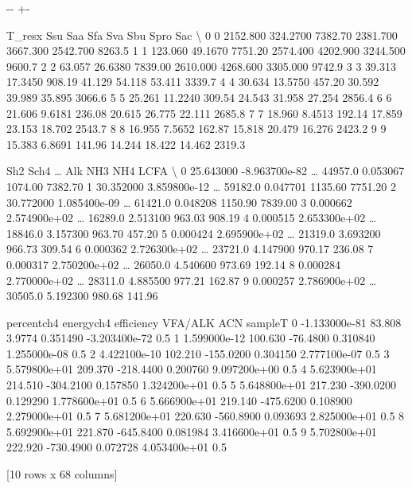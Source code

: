 \documentclass[a4paper,10pt,english]{sphinxmanual}
\newlength\nbsphinxcodecellspacing
\begin{document}
{

\kern-\sphinxverbatimsmallskipamount\kern-\baselineskip
\kern+\FrameHeightAdjust\kern-\fboxrule
\vspace{\nbsphinxcodecellspacing}

\begin{sphinxVerbatim}[commandchars=\\\{\}]
\llap{\color{nbsphinxout}[7]:\,\hspace{\fboxrule}\hspace{\fboxsep}}   T\_resx      Ssu       Saa      Sfa       Sva       Sbu      Spro     Sac   \textbackslash{}
0       0  2152.800  324.2700  7382.70  2381.700  3667.300  2542.700  8263.5
1       1   123.060   49.1670  7751.20  2574.400  4202.900  3244.500  9600.7
2       2    63.057   26.6380  7839.00  2610.000  4268.600  3305.000  9742.9
3       3    39.313   17.3450   908.19    41.129    54.118    53.411  3339.7
4       4    30.634   13.5750   457.20    30.592    39.989    35.895  3066.6
5       5    25.261   11.2240   309.54    24.543    31.958    27.254  2856.4
6       6    21.606    9.6181   236.08    20.615    26.775    22.111  2685.8
7       7    18.960    8.4513   192.14    17.859    23.153    18.702  2543.7
8       8    16.955    7.5652   162.87    15.818    20.479    16.276  2423.2
9       9    15.383    6.8691   141.96    14.244    18.422    14.462  2319.3

        Sh2          Sch4   {\ldots}     Alk       NH3      NH4     LCFA   \textbackslash{}
0  25.643000 -8.963700e-82  {\ldots}  44957.0  0.053067  1074.00  7382.70
1  30.352000  3.859800e-12  {\ldots}  59182.0  0.047701  1135.60  7751.20
2  30.772000  1.085400e-09  {\ldots}  61421.0  0.048208  1150.90  7839.00
3   0.000662  2.574900e+02  {\ldots}  16289.0  2.513100   963.03   908.19
4   0.000515  2.653300e+02  {\ldots}  18846.0  3.157300   963.70   457.20
5   0.000424  2.695900e+02  {\ldots}  21319.0  3.693200   966.73   309.54
6   0.000362  2.726300e+02  {\ldots}  23721.0  4.147900   970.17   236.08
7   0.000317  2.750200e+02  {\ldots}  26050.0  4.540600   973.69   192.14
8   0.000284  2.770000e+02  {\ldots}  28311.0  4.885500   977.21   162.87
9   0.000257  2.786900e+02  {\ldots}  30505.0  5.192300   980.68   141.96

    percentch4    energych4   efficiency   VFA/ALK           ACN  sampleT
0 -1.133000e-81       83.808      3.9774  0.351490 -3.203400e-72      0.5
1  1.599000e-12      100.630    -76.4800  0.310840  1.255000e-08      0.5
2  4.422100e-10      102.210   -155.0200  0.304150  2.777100e-07      0.5
3  5.579800e+01      209.370   -218.4400  0.200760  9.097200e+00      0.5
4  5.623900e+01      214.510   -304.2100  0.157850  1.324200e+01      0.5
5  5.648800e+01      217.230   -390.0200  0.129290  1.778600e+01      0.5
6  5.666900e+01      219.140   -475.6200  0.108900  2.279000e+01      0.5
7  5.681200e+01      220.630   -560.8900  0.093693  2.825000e+01      0.5
8  5.692900e+01      221.870   -645.8400  0.081984  3.416600e+01      0.5
9  5.702800e+01      222.920   -730.4900  0.072728  4.053400e+01      0.5

[10 rows x 68 columns]
\end{sphinxVerbatim}
}
\end{document}
